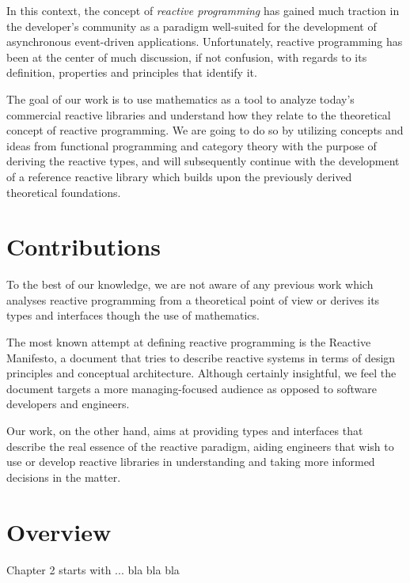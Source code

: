 In this context, the concept of \textit{reactive programming} has gained much traction in the developer's community as a paradigm well-suited for the development of asynchronous  event-driven applications\cite{bainomugisha2013survey}. Unfortunately, reactive programming has been at the center of much discussion, if not confusion, with regards to its definition, properties and principles that identify it\cite{meijer2014reactive}.

The goal of our work is to use mathematics as a tool to analyze today's commercial reactive libraries and understand how they relate to the theoretical concept of reactive programming.  We are going to do so by utilizing concepts and ideas from functional programming and category theory with the purpose of deriving the reactive types, and will subsequently continue with the development of a reference reactive library which builds upon the previously derived theoretical foundations. 

\section*{Contributions}

To the best of our knowledge, we are not aware of any previous work which analyses reactive programming from a theoretical point of view or derives its types and interfaces though the use of mathematics.

The most known attempt at defining reactive programming is the Reactive Manifesto\cite{reactive-manifesto}, a document that tries to describe reactive systems in terms of design principles and conceptual architecture. Although certainly insightful, we feel the document targets a more managing-focused audience as opposed to software developers and engineers. 

Our work, on the other hand, aims at providing types and interfaces that describe the real essence of the reactive paradigm, aiding engineers that wish to use or develop reactive libraries in understanding and taking more informed decisions in the matter.

\section*{Overview}

Chapter 2 starts with ... bla bla bla


